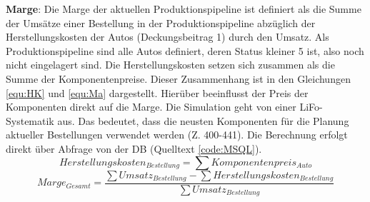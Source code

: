 \textbf{Marge}: Die Marge der aktuellen Produktionspipeline ist definiert als die Summe der Umsätze einer Bestellung in der Produktionspipeline abzüglich der Herstellungskosten der Autos (Deckungsbeitrag 1) durch den Umsatz. Als Produktionspipeline sind alle Autos definiert, deren Status kleiner 5 ist, also noch nicht eingelagert sind. Die Herstellungskosten setzen sich zusammen als die Summe der Komponentenpreise. Dieser Zusammenhang ist in den Gleichungen \ref{equ:HK} und \ref{equ:Ma} dargestellt. Hierüber beeinflusst der Preis der Komponenten direkt auf die Marge. Die Simulation geht von einer \ac{LiFo}-Systematik aus. Das bedeutet, dass die neusten Komponenten für die Planung aktueller Bestellungen verwendet werden (Z. 400-441). Die Berechnung erfolgt direkt über Abfrage von der \ac{DB} (Quelltext \ref{code:MSQL}).
\begin{equation}\label{equ:HK}
    Herstellungskosten_{Bestellung} = \sum Komponentenpreis_{Auto}
\end{equation}
\begin{equation}\label{equ:Ma}
    Marge_{Gesamt} = \frac{\sum Umsatz_{Bestellung} - \sum Herstellungskosten_{Bestellung}}{\sum Umsatz_{Bestellung}}
\end{equation}
 \label{code:MSQL}

